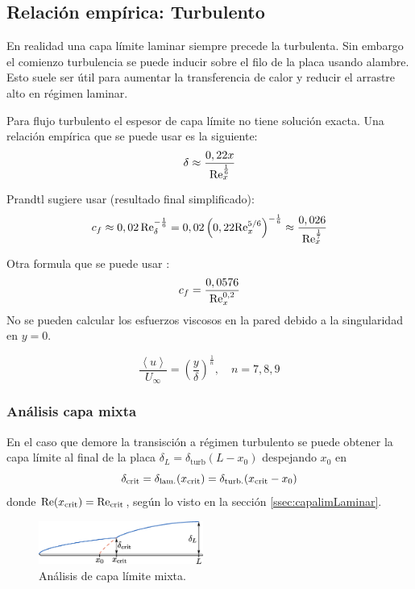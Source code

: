 \subsection{Relación empírica: Turbulento}
En realidad una capa límite laminar siempre precede la turbulenta. Sin embargo el comienzo turbulencia se puede inducir sobre el filo de la placa usando alambre. Esto suele ser útil para aumentar la transferencia de calor y reducir el arrastre alto en régimen laminar.

Para flujo turbulento el espesor de capa límite no tiene solución exacta. Una relación empírica que se puede usar es la siguiente:
\begin{equation}
    \delta \approx \frac{0,22x}{\textrm{Re}_x^{\frac{1}{6}}}
\end{equation}

Prandtl sugiere usar (resultado final simplificado):
\[
c_f \approx 0,02\, \textrm{Re}_\delta^{-\frac{1}{6}} = 0,02\left(0,22 \textrm{Re}_x^{5/6}\right)^{-\frac{1}{6}}\approx \frac{0,026}{\textrm{Re}_x^{\frac{1}{7}}} 
\]

Otra formula que se puede usar \citep{kreith2011principles}:
\begin{equation}
    c_f=\frac{0,0576}{\textrm{Re}_x^{0,2}}
\end{equation}
No se pueden calcular los esfuerzos viscosos en la pared debido a la singularidad en $y=0$.

\[
\frac{\left\langle u \right\rangle}{U_\infty} = \left(\frac{y}{\delta} \right)^{\frac{1}{n}}, \quad n=7,8,9
\]
\subsubsection{Análisis capa mixta}

En el caso que demore la transisción a régimen turbulento se puede obtener la capa límite al final de la placa $\delta_L=\delta_{\mathrm{turb}}(L-x_0)$ despejando $x_0$ en
\[
\delta_{\mathrm{crit}} =\delta_{\mathrm{lam.}}(x_{\mathrm{crit}}) = \delta_{\mathrm{turb.}}(x_{\mathrm{crit}}-x_0) 
\]
donde $\textrm{Re}(x_{\mathrm{crit}}) =\textrm{Re}_{{\mathrm{crit}}}$, según lo visto en la sección \ref{ssec:capalimLaminar}.

\begin{figure}[htb!]
	\centering
	\includegraphics[width=0.48\textwidth]{fig/BLmixed.eps}
	\caption{Análisis de capa límite mixta.}
	\label{fig:BLmixed}
\end{figure}



